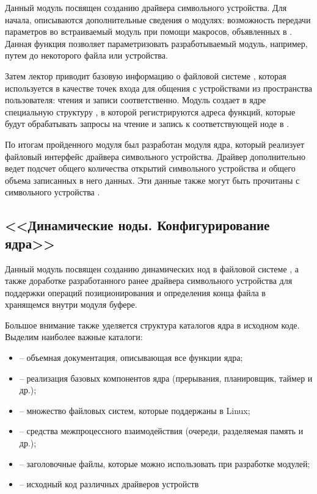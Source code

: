 Данный модуль посвящен созданию драйвера символьного устройства. Для начала, описываются дополнительные сведения о модулях: возможность передачи параметров во встраиваемый модуль при помощи макросов, объявленных в . Данная функция позволяет параметризовать разработываемый модуль, например, путем до некоторого файла или устройства.

Затем лектор приводит базовую информацию о файловой системе , которая используется в качестве точек входа для общения с устройствами из пространства пользователя: чтения и записи соответственно. Модуль создает в ядре специальную структуру , в которой регистрируются адреса функций, которые будут обрабатывать запросы на чтение и запись к соответствующей ноде в . 

По итогам пройденного модуля был разработан модуля ядра, который реализует файловый интерфейс драйвера символьного устройства. Драйвер дополнительно ведет подсчет общего количества открытий символьного устройства и общего объема записанных в него данных. Эти данные также могут быть прочитаны с символьного устройства .


\subsection{<<Динамические ноды. Конфигурирование ядра>>}

Данный модуль посвящен созданию динамических нод в файловой системе , а также доработке разработанного ранее драйвера символьного устройства для поддержки операций позиционирования и определения конца файла в хранящемся внутри модуля буфере.

Большое внимание также уделяется структура каталогов ядра в исходном коде. Выделим наиболее важные каталоги:
\begin{itemize}
	\item {} -- объемная документация, описывающая все функции ядра;
	\item {} -- реализация базовых компонентов ядра (прерывания, планировщик, таймер и др.);
	\item {} -- множество файловых систем, которые поддержаны в Linux;
	\item {} -- средства межпроцессного взаимодействия (очереди, разделяемая память и др.);
	\item {} -- заголовочные файлы, которые можно использовать при разработке модулей;
	\item {} -- исходный код различных драйверов устройств
\end{itemize}


